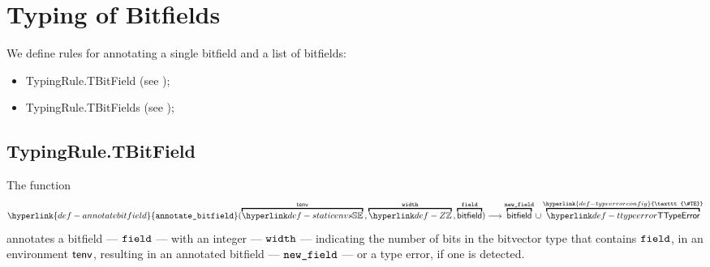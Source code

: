 \documentclass{book}
\newcommand\TypeErrorConfig[0]{\hyperlink{def-typeerrorconfig}{\texttt{\#TE}}}
\newcommand\annotatebitfield[0]{\hyperlink{def-annotatebitfield}{\texttt{annotate\_bitfield}}}
\begin{document}
\chapter{Typing of Bitfields}

We define rules for annotating a single bitfield and a list of bitfields:
\begin{itemize}
  \item TypingRule.TBitField (see );
  \item TypingRule.TBitFields (see );
\end{itemize}

\section{TypingRule.TBitField \label{sec:TypingRule.TBitField}}
\hypertarget{def-annotatebitfield}{}
The function
\[
  \annotatebitfield(\overname{\staticenvs}{\tenv} \aslsep \overname{\Z}{\width} \aslsep \overname{\bitfield}{\field})
  \aslto \overname{\bitfield}{\newfield} \cup \overname{\TTypeError}{\TypeErrorConfig}
\]
annotates a bitfield --- $\texttt{field}$ --- with an integer --- $\texttt{width}$ --- indicating the number of bits in
the bitvector type that contains $\texttt{field}$,
in an environment $\textsf{tenv}$, resulting in an
annotated bitfield --- $\texttt{new\_field}$ --- or a type error, if one is detected.
\end{document}

